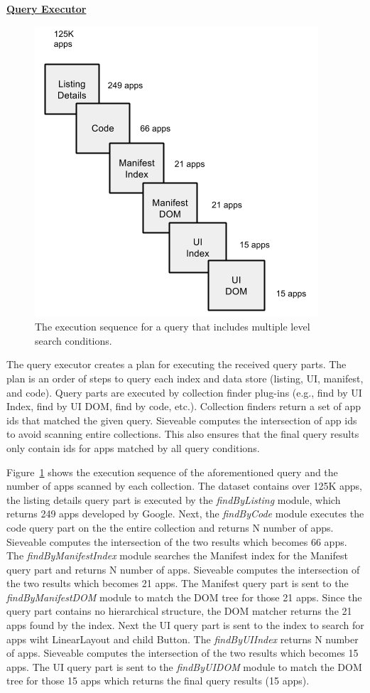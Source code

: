 \underline{\textbf{Query Executor}}
\begin{figure}
	\centering
	\includegraphics[scale=0.5]{figures/sieveable-deep-search/queryExecution}
	\caption{The execution sequence for a query that includes multiple level search conditions.}
	\label{fig:fig_query_execution}
\end{figure}
The query executor creates a plan for executing the received query parts.
The plan is an order of steps to query each index and data store (listing, UI, manifest, and code).
Query parts are executed by collection finder plug-ins (e.g., find by UI Index, find by UI DOM, find by code, etc.).
Collection finders return a set of app ids that matched the given query.
Sieveable computes the intersection of app ids to avoid scanning entire collections.
This also ensures that the final query results only contain ids for apps matched by all query conditions.

Figure~\ref{fig:fig_query_execution} shows the execution sequence of the aforementioned query and the number of apps scanned by each collection.
The dataset contains over 125K apps, the listing details query part is executed by the \textit{findByListing} module, which returns 249 apps developed by Google.
Next, the \textit{findByCode} module executes the code query part on the the entire collection and returns N number of apps.
Sieveable computes the intersection of the two results which becomes 66 apps.
The \textit{findByManifestIndex} module searches the Manifest index for the Manifest query part and returns N number of apps.
Sieveable computes the intersection of the two results which becomes 21 apps.
The Manifest query part is sent to the \textit{findByManifestDOM} module to match the DOM tree for those 21 apps. Since the query part contains no hierarchical structure, the DOM matcher returns the 21 apps found by the index.
Next the UI query part is sent to the index to search for apps wiht LinearLayout and child Button.
The \textit{findByUIIndex} returns N number of apps. 
Sieveable computes the intersection of the two results which becomes 15 apps.
The UI query part is sent to the \textit{findByUIDOM} module to match the DOM tree for those 15 apps which returns the final query results (15 apps).


